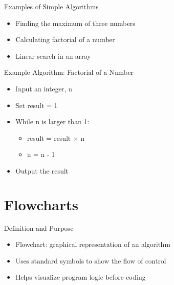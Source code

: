 \documentclass[12pt, aspectratio=169]{beamer}
\begin{document}
    \begin{frame}{Examples of Simple Algorithms}
        \begin{itemize}
            \item Finding the maximum of three numbers
            \item Calculating factorial of a number
            \item Linear search in an array
        \end{itemize}
    \end{frame}


    \begin{frame}{Example Algorithm: Factorial of a Number}
        \begin{itemize}
            \item Input an integer, n
            \item Set result = 1
            \item While n is larger than 1:
            \begin{itemize}
                \item result = result × n
                \item n = n - 1
            \end{itemize}
            \item Output the result
        \end{itemize}
    \end{frame}


    \section{Flowcharts}


    \begin{frame}{Definition and Purpose}
        \begin{itemize}
            \item Flowchart: graphical representation of an algorithm
            \item Uses standard symbols to show the flow of control
            \item Helps visualize program logic before coding
        \end{itemize}
    \end{frame}
\end{document}
